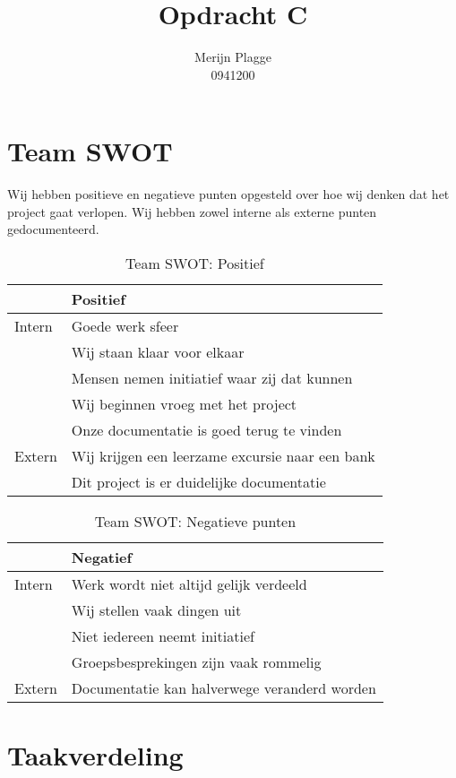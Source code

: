 \documentclass{article}
\title{Opdracht C}
\author{Merijn Plagge \\ 0941200}
\begin{document}
\maketitle

\section{Team SWOT}

Wij hebben positieve en negatieve punten opgesteld over hoe wij denken dat het project gaat verlopen.
Wij hebben zowel interne als externe punten gedocumenteerd.

\begin{table}[h!]
\caption{Team SWOT: Positief}
\label{tab: Team SWOT: Positief}
\begin{tabular}{l|l}
        & \textbf{Positief} \\
        \hline
        {Intern} 	& Goede werk sfeer \\ 
			& Wij staan klaar voor elkaar \\
			& Mensen nemen initiatief waar zij dat kunnen \\
			& Wij beginnen vroeg met het project \\
			& Onze documentatie is goed terug te vinden \\
        {Extern}	& Wij krijgen een leerzame excursie naar een bank \\
			& Dit project is er duidelijke documentatie \\	
\end{tabular}
\end{table}

\begin{table}[h!]
\caption{Team SWOT: Negatieve punten}
\label{tab: Negatieve punten}
\begin{tabular}{l|l}
        & \textbf{Negatief}\\
        \hline
        {Intern} 	& Werk wordt niet altijd gelijk verdeeld \\
			& Wij stellen vaak dingen uit \\
			& Niet iedereen neemt initiatief \\
			& Groepsbesprekingen zijn vaak rommelig \\
        {Extern}	& Documentatie kan halverwege veranderd worden\\
\end{tabular}
\end{table}


\newpage

\section{Taakverdeling}
\end{document}
